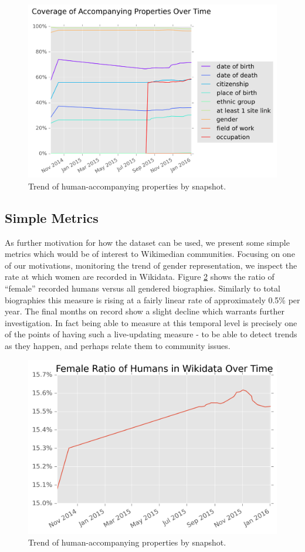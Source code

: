 \documentclass[letterpaper]{article}
\begin{document}
\begin{figure}
\label{fig:accompanying}
\includegraphics[scale=0.5]{figures/additionalprops.png} 
\caption{Trend of human-accompanying properties by snapshot.}
\end{figure}

\subsection{Simple Metrics}
As further motivation for how the dataset can be used, we present some simple metrics which would be of interest to Wikimedian communities. Focusing on one of our motivations, monitoring the trend of gender representation, we inspect the rate at which women are recorded in Wikidata. Figure \ref{fig:frb} shows the ratio of ``female'' recorded humans versus all gendered biographies. Similarly to total biographies this measure is rising at a fairly linear rate of approximately 0.5\% per year. The final months on record show a slight decline which warrants further investigation. In fact being able to measure at this temporal level is precisely one of the points of having such a live-updating measure - to be able to detect trends as they happen, and perhaps relate them to community issues. 

\begin{figure}
\label{fig:frb}
\includegraphics[scale=0.6]{figures/frbwikidata.png} 
\caption{Trend of human-accompanying properties by snapshot.}
\end{figure}
\end{document}
